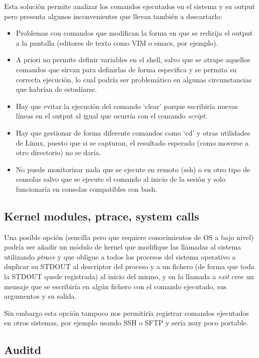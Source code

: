 Esta solución permite analizar los comandos ejecutados en el sistema y su output pero presenta algunos inconvenientes que llevan también a descartarlo:

\begin{itemize}
    \item Problemas con comandos que modifican la forma en que se redirija el output a la pantalla (editores de texto como VIM o emacs, por ejemplo).
    \item A priori no permite definir variables en el shell, salvo que se atrape aquellos comandos que sirvan para definirlas de forma especifica y se permita su correcta ejecución, lo cual podría ser problemático en algunas circunstancias que habrían de estudiarse.
    \item Hay que evitar la ejecución del comando `clear' porque escribiría nuevas líneas en el output al igual que ocurría con el comando \textit{script}.
    \item Hay que gestionar de forma diferente comandos como `cd' y otras utilidades de Linux, puesto que si se capturan, el resultado esperado (como moverse a otro directorio) no se daría.
    \item No puede monitorizar nada que se ejecute en remoto (ssh) o en otro tipo de consolas salvo que se ejecute el comando al inicio de la sesión y solo funcionaría en consolas compatibles con bash.
\end{itemize}

\subsection{Kernel modules, ptrace, system calls}

Una posible opción (sencilla pero que requiere conocimientos de OS a bajo nivel) podría ser añadir un módulo de kernel que modifique las llamadas al sistema utilizando \textit{ptrace} y que obligue a todos los procesos del sistema operativo a duplicar su STDOUT al descriptor del proceso y a un fichero (de forma que toda la STDOUT quede registrada) al inicio del mismo, y en la llamada a \textit{exit} cree un mensaje que se escribiría en algún fichero con el comando ejecutado, sus argumentos y su salida. 

Sin embargo esta opción tampoco nos permitiría registrar comandos ejecutados en otros sistemas, por ejemplo usando SSH o SFTP y sería muy poco portable. 

\subsection{Auditd}

